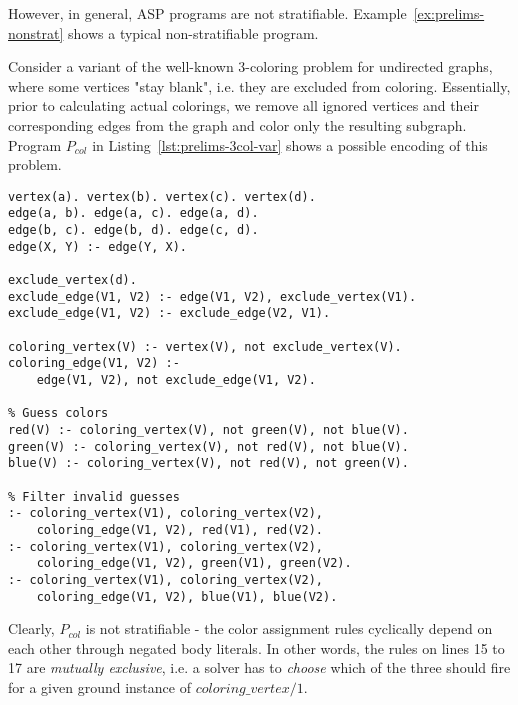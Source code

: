 However, in general, ASP programs are not stratifiable. Example~\ref{ex:prelims-nonstrat} shows a typical non-stratifiable program.

\begin{example}
\label{ex:prelims-nonstrat}
Consider a variant of the well-known 3-coloring problem for undirected graphs, where some vertices "stay blank", i.e. they are excluded from coloring. Essentially, prior to calculating actual colorings, we remove all ignored vertices and their corresponding edges from the graph and color only the resulting subgraph. Program $P_{col}$ in Listing~\ref{lst:prelims-3col-var} shows a possible encoding of this problem.
\begin{lstlisting}[style=asp-code, label={lst:prelims-3col-var}, caption={Graph 3-coloring with excluded vertices}]
vertex(a). vertex(b). vertex(c). vertex(d).
edge(a, b). edge(a, c). edge(a, d).
edge(b, c). edge(b, d). edge(c, d).
edge(X, Y) :- edge(Y, X).

exclude_vertex(d).
exclude_edge(V1, V2) :- edge(V1, V2), exclude_vertex(V1).
exclude_edge(V1, V2) :- exclude_edge(V2, V1).

coloring_vertex(V) :- vertex(V), not exclude_vertex(V).
coloring_edge(V1, V2) :- 
	edge(V1, V2), not exclude_edge(V1, V2).

% Guess colors
red(V) :- coloring_vertex(V), not green(V), not blue(V).
green(V) :- coloring_vertex(V), not red(V), not blue(V).
blue(V) :- coloring_vertex(V), not red(V), not green(V).

% Filter invalid guesses
:- coloring_vertex(V1), coloring_vertex(V2), 
	coloring_edge(V1, V2), red(V1), red(V2).
:- coloring_vertex(V1), coloring_vertex(V2), 
	coloring_edge(V1, V2), green(V1), green(V2).
:- coloring_vertex(V1), coloring_vertex(V2), 
	coloring_edge(V1, V2), blue(V1), blue(V2).
\end{lstlisting}
Clearly, $P_{col}$ is not stratifiable - the color assignment rules cyclically depend on each other through negated body literals. In other words, the rules on lines 15 to 17 are \emph{mutually exclusive}, i.e. a solver has to \emph{choose} which of the three should fire for a given ground instance of $coloring\_vertex/1$.
\end{example}

